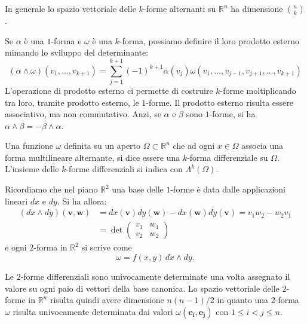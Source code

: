 \documentclass[italian,a4paper]{scrartcl}
\newcommand{\RR}{{\mathbb R}}
\renewcommand{\vec}{\mathbf}
\begin{document}
In generale lo spazio
vettoriale delle $k$-forme alternanti su $\RR^n$ ha dimensione ${n
  \choose k}$.

Se $\alpha$ è una $1$-forma e $\omega$ è una $k$-forma, possiamo
definire il loro prodotto esterno mimando lo sviluppo del
determinante:
\[
  (\alpha \wedge \omega)(v_1,\dots,v_{k+1}) = \sum_{j=1}^{k+1}
(-1)^{k+1}\alpha(v_j) \omega(v_1,\dots, v_{j-1},v_{j+1},\dots,v_{k+1})
\]
L'operazione di prodotto esterno ci permette di costruire
$k$-forme moltiplicando tra loro, tramite prodotto esterno, le
$1$-forme. Il prodotto esterno risulta essere associativo, ma non
commutativo. Anzi, se $\alpha$ e $\beta$ sono $1$-forme, si ha
$\alpha\wedge \beta  = - \beta \wedge \alpha$.

Una funzione $\omega$ definita su un aperto $\Omega\subset \RR^n$ che
ad ogni $x\in \Omega$ associa una forma multilineare alternante, si
dice essere una $k$-forma differenziale su $\Omega$. L'insieme delle
$k$-forme differenziali si indica con $\Lambda^k(\Omega)$.

\begin{example}
Ricordiamo che nel piano $\RR^2$ una base delle $1$-forme è
data dalle applicazioni lineari $dx$ e $dy$.
Si ha allora:
\begin{align*}
  (dx\wedge dy)(\vec v,\vec w) & =dx(\vec v)dy(\vec w) - dx(\vec w)dy(\vec v) = v_1 w_2 - w_2 v_1\\
&=\det \begin{pmatrix}
v_1 & w_1 \\
v_2 & w_2
\end{pmatrix} 
\end{align*}
e ogni $2$-forma in $\RR^2$ si scrive come
\[
\omega = f(x,y)\, dx\wedge dy.
\]
\end{example}


Le $2$-forme differenziali sono univocamente determinate una volta
assegnato il valore su ogni paio di vettori della base
canonica. Lo spazio vettoriale delle $2$-forme in $\RR^n$ risulta
quindi avere dimensione $n(n-1)/2$ in quanto una $2$-forma $\omega$ risulta
univocamente determinata dai valori $\omega(\vec {e_i}, \vec {e_j})$
con $1 \le i < j \le n$. 
\end{document}
